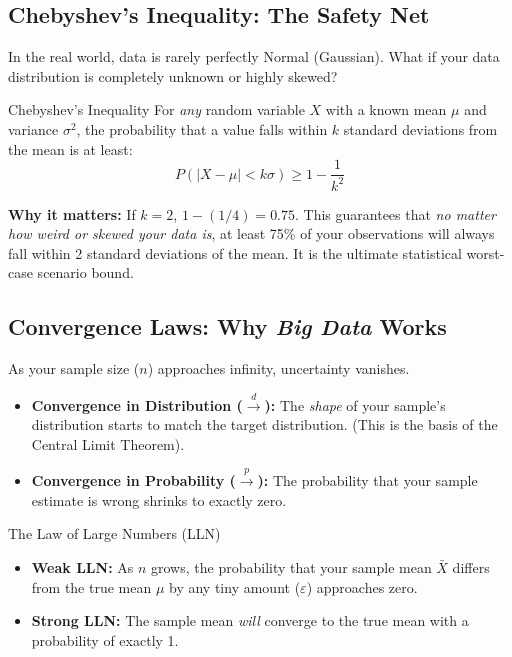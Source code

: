 \subsection{Chebyshev's Inequality: The Safety Net}
In the real world, data is rarely perfectly Normal (Gaussian). What if your data distribution is completely unknown or highly skewed?

\begin{defbox}{Chebyshev's Inequality}
For \textit{any} random variable $X$ with a known mean $\mu$ and variance $\sigma^2$, the probability that a value falls within $k$ standard deviations from the mean is at least:
\begin{equation}
    P(|X - \mu| < k\sigma) \geq 1 - \frac{1}{k^2}
\end{equation}
\end{defbox}

\textbf{Why it matters:} If $k=2$, $1 - (1/4) = 0.75$. This guarantees that \textit{no matter how weird or skewed your data is}, at least 75\% of your observations will always fall within 2 standard deviations of the mean. It is the ultimate statistical worst-case scenario bound.

\subsection{Convergence Laws: Why \textit{Big Data} Works}
As your sample size ($n$) approaches infinity, uncertainty vanishes.

\begin{itemize}
    \item \textbf{Convergence in Distribution ($\xrightarrow{d}$):} The \textit{shape} of your sample's distribution starts to match the target distribution. (This is the basis of the Central Limit Theorem).
    \item \textbf{Convergence in Probability ($\xrightarrow{p}$):} The probability that your sample estimate is wrong shrinks to exactly zero.
\end{itemize}

\begin{defbox}{The Law of Large Numbers (LLN)}
\begin{itemize}
    \item \textbf{Weak LLN:} As $n$ grows, the probability that your sample mean $\bar{X}$ differs from the true mean $\mu$ by any tiny amount ($\varepsilon$) approaches zero.
    \item \textbf{Strong LLN:} The sample mean \textit{will} converge to the true mean with a probability of exactly 1.
\end{itemize}
\end{defbox}

